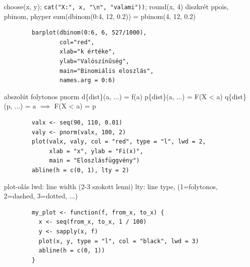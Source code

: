 \documentclass[12pt,a4paper]{article}
\begin{document}
\begin{outline}
	\1 choose(x, y); \verb|cat("X:", x, "\n", "valami"))|; round(x, 4)
	\1 diszkrét
		\2 ppois, pbinom, phyper
		\2 sum(dbinom(0:4, 12, 0.2)) = pbinom(4, 12, 0.2)
		\2 \begin{verbatim}
		barplot(dbinom(0:6, 6, 527/1000),
		        col="red",
		        xlab="k értéke",
		        ylab="Valószínűség",
		        main="Binomiális eloszlás",
		        names.arg = 0:6)
		\end{verbatim}
	\1 abszolút folytonos
		\2 pnorm
		\2 d\{dist\}(a, ...) = f(a)
		\2 p\{dist\}(a, ...) = F(X < a)
		\2 q\{dist\}(p, ...) = a $\implies$ F(X < a) = p
		\2 \begin{verbatim}
		valx <- seq(90, 110, 0.01)
		valy <- pnorm(valx, 100, 2)
		plot(valx, valy, col = "red", type = "l", lwd = 2,
		     xlab = "x", ylab = "Fi(x)",
		     main = "Eloszlásfüggvény")
		abline(h = c(0, 1), lty = 2)
		\end{verbatim}
	\1 plot-olás
		\2 lwd: line width (2-3 szokott lenni)
		\2 lty: line type, (1=folytonos, 2=dashed, 3=dotted, ...)
		\2 \begin{verbatim}
		my_plot <- function(f, from_x, to_x) {
		  x <- seq(from_x, to_x, 1 / 100)
		  y <- sapply(x, f)
		  plot(x, y, type = "l", col = "black", lwd = 3)
		  abline(h = c(0, 1))
		}
		\end{verbatim}
\end{outline}
\end{document}

